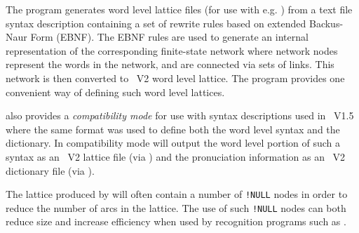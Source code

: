 %
%

\newpage
{}


The  program generates word level lattice files (for use
with e.g. ) from a text file syntax description containing a 
set of rewrite rules based on extended Backus-Naur Form (EBNF). 
The EBNF rules are used to generate an internal
representation of the corresponding finite-state network where 
network nodes represent the words in the network, and are connected via
sets of links. This  network is then converted to \HTK\ V2 word
level lattice. The program provides one convenient way of defining such
word level lattices. 

 also provides a {\em compatibility mode} for use
with  syntax descriptions used in \HTK\ V1.5 where
the same format was used to define both the word level syntax 
and the dictionary.
In compatibility mode  will output the word level
portion of such a syntax as an \HTK\ V2 lattice file (via )
and the pronuciation information as an \HTK\ V2 dictionary file (via 
).

The lattice produced by  will often contain a number
of \texttt{!NULL} nodes in order to reduce the number of arcs in the
lattice. The use of such \texttt{!NULL} nodes can both
reduce size and  increase efficiency when used by recognition programs 
such as .

